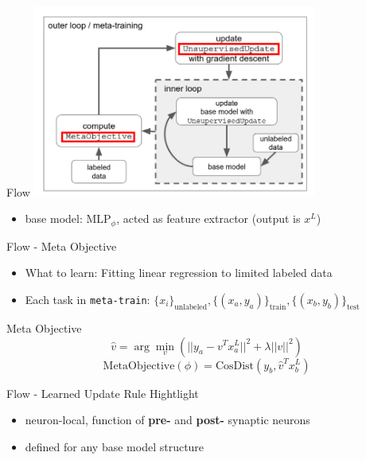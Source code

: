\documentclass{beamer}
\begin{document}
\begin{frame}{Flow}
  \center \includegraphics[width=0.7\textwidth]{fig/flow-anno.png}
  \begin{itemize}
    \item base model: $\text{MLP}_{\phi}$, acted as feature extractor (output is $x^L$)
  \end{itemize}
\end{frame}

\begin{frame}{Flow - Meta Objective}
  \begin{itemize}
    \item What to learn: Fitting linear regression to limited labeled data 
    \item Each task in \texttt{meta-train}: $\lbrace x_i \rbrace_{\text{unlabeled}}, \lbrace (x_a,y_a) \rbrace_\text{train}, \lbrace (x_b,y_b) \rbrace_\text{test}$
  \end{itemize}
  
  \begin{block}{Meta Objective}
    \[ \hat{v} = \arg \min_v (||y_a - v^Tx_a^L||^2 + \lambda ||v||^2) \]
    \[ \text{MetaObjective}(\phi) = \text{CosDist}(y_b,\hat{v}^Tx_b^L) \]
  \end{block}
  
\end{frame}

\begin{frame}{Flow - Learned Update Rule}
  Hightlight
  \begin{itemize}
    \item neuron-local, function of \textbf{pre-} and \textbf{post-} synaptic neurons
    \item defined for any base model structure
  \end{itemize}
\end{frame}
\end{document}
